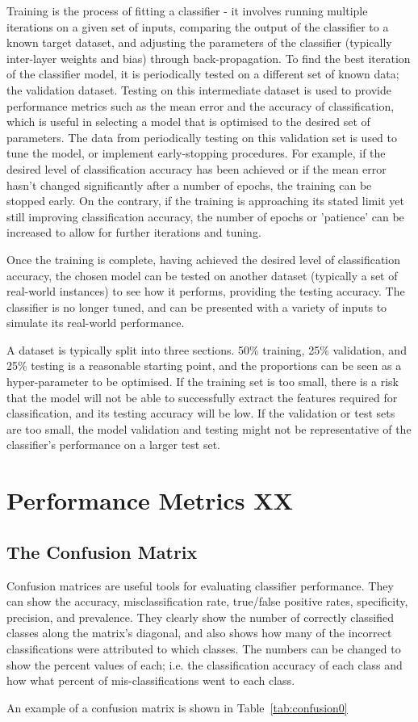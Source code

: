 Training is the process of fitting a classifier - it involves running multiple iterations on a given set of inputs, comparing the output of the classifier to a known target dataset, and adjusting the parameters of the classifier (typically inter-layer weights and bias) through back-propagation. To find the best iteration of the classifier model, it is periodically tested on a different set of known data; the validation dataset. Testing on this intermediate dataset is used to provide performance metrics such as the mean error and the accuracy of classification, which is useful in selecting a model that is optimised to the desired set of parameters. The data from periodically testing on this validation set is used to tune the model, or implement early-stopping procedures. For example, if the desired level of classification accuracy has been achieved or if the mean error hasn't changed significantly after a number of epochs, the training can be stopped early. On the contrary, if the training is approaching its stated limit yet still improving classification accuracy, the number of epochs or 'patience' can be increased to allow for further iterations and tuning.

Once the training is complete, having achieved the desired level of classification accuracy, the chosen model can be tested on another dataset (typically a  set of real-world instances) to see how it performs, providing the testing accuracy. The classifier is no longer tuned, and can be presented with a variety of inputs to simulate its real-world performance.

A dataset is typically split into three sections. 50\% training, 25\% validation, and 25\% testing is a reasonable starting point, and the proportions can be seen as a hyper-parameter to be optimised. If the training set is too small, there is a risk that the model will not be able to successfully extract the features required for classification, and its testing accuracy will be low. If the validation or test sets are too small, the model validation and testing might not be representative of the classifier's performance on a larger test set.

\section{Performance Metrics XX}
\subsection{The Confusion Matrix}
Confusion matrices are useful tools for evaluating classifier performance. They can show the accuracy, misclassification rate, true/false positive rates, specificity, precision, and prevalence. They clearly show the number of correctly classified classes along the matrix's diagonal, and also shows how many of the incorrect classifications were attributed to which classes. The numbers can be changed to show the percent values of each; i.e. the classification accuracy of each class and how what percent of mis-classifications went to each class.

An example of a confusion matrix is shown in Table~\ref{tab:confusion0}






